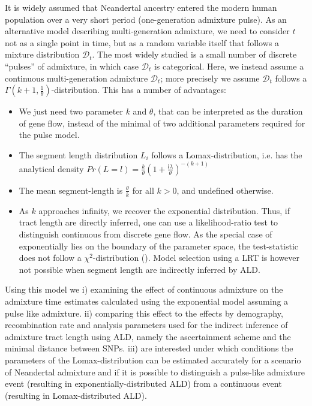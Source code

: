 \documentclass[]{article}
\begin{document}
It is widely assumed that Neandertal ancestry entered the modern human
population over a very short period (one-generation admixture pulse). As an alternative model describing multi-generation admixture, we need to
consider \(t\) not as a single point in time, but as a random variable
itself that follows a mixture distribution \(\mathcal{D}_t\). The most
widely studied is a small number of discrete ``pulses'' of admixture, in
which case \(\mathcal{D}_t\) is categorical. Here, we instead assume a
continuous multi-generation admixture \(\mathcal{D}_t\); more precisely we assume \(\mathcal{D}_t\)
follows a \(\Gamma(k+1, \frac{1}{\theta})\)-distribution. This has a number of
advantages:

\begin{itemize}
    \item We just need two parameter $k$ and $\theta$, that can be interpreted as the duration of gene flow, instead of the minimal of two additional parameters required for the pulse model.
    \item The segment length distribution $L_i$ follows a Lomax-distribution, i.e. has the analytical density $Pr(L=l) = \frac{k}{\theta} (1+\frac{l\lambda}{\theta})^{-(k+1)}$
    \item The mean segment-length is  $\frac{\theta}{k}$ for all $k > 0$, and undefined otherwise. 
    \item As $k$ approaches infinity, we recover the exponential distribution. Thus, if tract length are directly inferred, one can use a likelihood-ratio test to distinguish continuous from discrete gene flow. As the special case of exponentially lies on the boundary of the parameter space, the test-statistic does not follow a $\chi^2$-distribution (\cite{Kozubowski_Testing_2008}). Model selection using a LRT is however not possible when segment length are indirectly inferred by ALD.
\end{itemize}

Using this model we i) examining the effect of continuous admixture on
the admixture time estimates calculated using the exponential model
assuming a pulse like admixture. ii) comparing this effect to the
effects by demography, recombination rate and analysis parameters used
for the indirect inference of admixture tract length using ALD, namely
the ascertainment scheme and the minimal distance between SNPs. iii) are
interested under which conditions the parameters of the
Lomax-distribution can be estimated accurately for a scenario of
Neandertal admixture and if it is possible to distinguish a pulse-like
admixture event (resulting in exponentially-distributed ALD)
from a continuous event (resulting in Lomax-distributed ALD).
\end{document}

